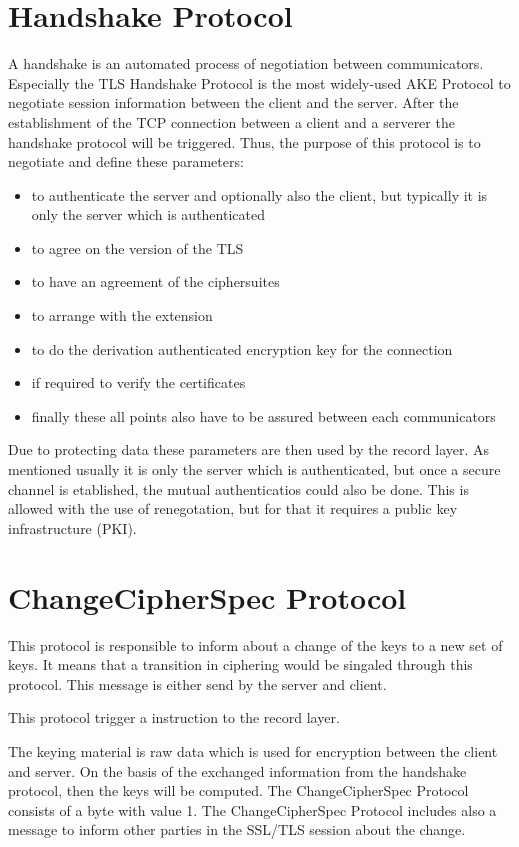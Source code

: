 \section{Handshake Protocol}
\label{sec:handshake_protocol}
 A handshake is an automated process of negotiation between communicators. Especially the TLS Handshake Protocol is the most widely-used  AKE Protocol to negotiate session information between the client and the server. 
 After the establishment of the TCP connection between a client and a serverer the handshake protocol will be triggered. 
 Thus, the purpose of this protocol is to negotiate and define these parameters:
 
 \begin{itemize}
\item to authenticate the server and optionally also the client, but typically it is only the server which is authenticated
 \item to agree on the version of the TLS
 \item to have an agreement of the ciphersuites
 \item to arrange with the extension
 \item to do the derivation authenticated encryption key for the connection
 \item if required to verify the certificates
 \item finally these all points also have to be assured between each communicators
\end{itemize}

Due to protecting data these parameters are then used by the record layer. As mentioned usually it is only the server which is authenticated, but once a secure channel is etablished, the mutual authenticatios could also be done. This is allowed with the use of renegotation, but for that it requires a public key infrastructure (PKI). 
\cite{ms:overview}
\cite{ms:handshake}

\section{ChangeCipherSpec Protocol}
\label{sec:changeciphfer_protocol}
This protocol is responsible to inform about a change of the keys to a new set of keys. It means that a transition in ciphering would be singaled through this protocol. This message is either send by the server and client. 

This protocol trigger a instruction to the record layer.

The keying material is raw data which is used for encryption between the client and server. On the basis of the exchanged information from the handshake protocol, then the keys will be computed.
The ChangeCipherSpec Protocol consists of a byte with value 1.
The ChangeCipherSpec Protocol includes also a message to inform other parties in the SSL/TLS session about the change.   \cite{ms:overview}

